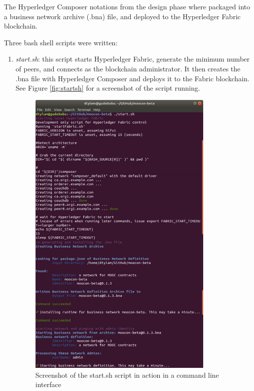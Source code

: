 The Hyperledger Composer notations from the design phase where packaged into
a business network archive (.bna) file, and deployed to the Hyperledger Fabric blockchain.

Three bash shell scripts were written:
\begin{enumerate}
	\setlength\itemsep{0em}
	\item \textit{start.sh}: this script starts Hyperledger Fabric, generate the minimum number of peers,
	      and connects as the blockchain administrator. It then creates the .bna file with Hyperledger Composer
	      and deploys it to the Fabric blockchain.
	      See Figure \ref{fig:startsh} for a screenshot of the script running.
	      \begin{figure}[!ht]
		      \centering
		      \includegraphics[width=0.85\textwidth]{startsh}
		      \caption[Blockchain Startup Script Screenshot]
		      {Screenshot of the start.sh script in action in a command line interface}

\end{figure}
\end{enumerate}
